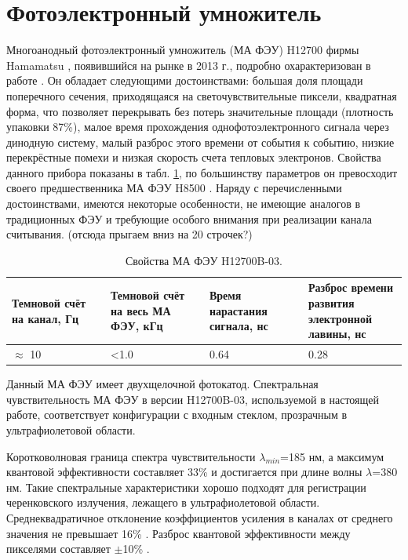 \section{Фотоэлектронный умножитель}\label{section:secMapmt}

Многоанодный фотоэлектронный умножитель (МА ФЭУ) H12700 фирмы Hamamatsu \cite{}, появившийся на рынке в 2013 г., подробно охарактеризован в работе \cite{}. Он обладает следующими достоинствами: большая доля площади поперечного сечения, приходящаяся на светочувствительные пиксели, квадратная форма, что позволяет перекрывать без потерь значительные площади (плотность упаковки 87\%), малое время прохождения однофотоэлектронного сигнала через динодную систему, малый разброс этого времени от события к событию, низкие перекрёстные помехи и низкая скорость счета тепловых электронов. Свойства данного прибора показаны в табл. \ref{tabl:MAPMT}, по большинству параметров он превосходит своего предшественника МА ФЭУ H8500 \cite{}. Наряду с перечисленными достоинствами, имеются некоторые особенности, не имеющие аналогов в традиционных ФЭУ и требующие особого внимания при реализации канала считывания. (отсюда прыгаем вниз на 20 строчек?)

\begin{table}[h]
\caption{Свойства МА ФЭУ H12700B-03.}
\label{tabl:MAPMT}
\begin{tabular}{ | p{0.25\linewidth} | p{0.25\linewidth} | p{0.25\linewidth} | p{0.25\linewidth} | }
	\hline
	Темновой счёт на канал, Гц & Темновой счёт на весь МА ФЭУ, кГц & Время нарастания сигнала, нс & Разброс времени развития электронной лавины, нс\\
	\hline
	$ \approx $ 10 & <1.0 & 0.64 & 0.28\\
	\hline
\end{tabular}
\end{table}

Данный МА ФЭУ имеет двухщелочной фотокатод. Спектральная чувствительность МА ФЭУ в версии H12700B-03, используемой в настоящей работе, соответствует конфигурации с входным стеклом, прозрачным в ультрафиолетовой области.

Коротковолновая граница спектра чувствительности $ \lambda_{min} $=185 нм, а максимум квантовой эффективности составляет 33\% и достигается при длине волны $ \lambda $=380 нм. Такие спектральные характеристики хорошо подходят для регистрации черенковского излучения, лежащего в ультрафиолетовой области. Среднеквадратичное отклонение коэффициентов усиления в каналах от среднего значения не превышает 16\% \cite{}. Разброс квантовой эффективности между пикселями составляет $ \pm $10\% \cite{}.


